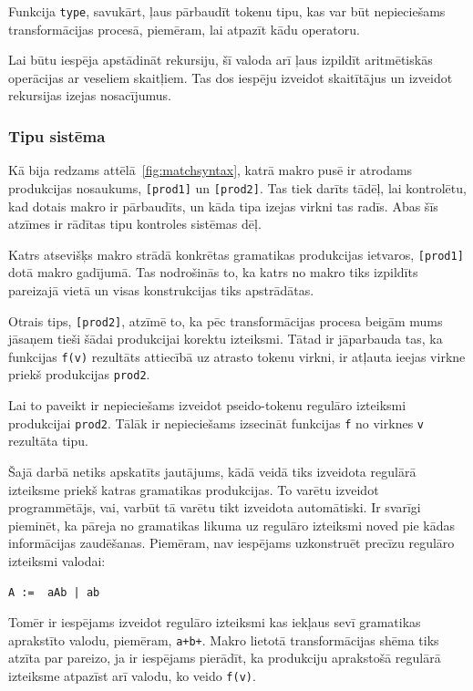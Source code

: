 Funkcija \verb|type|, savukārt, ļaus pārbaudīt tokenu tipu, kas var būt nepieciešams transformācijas procesā, piemēram, lai atpazīt kādu operatoru.

Lai būtu iespēja apstādināt rekursiju, šī valoda arī ļaus izpildīt aritmētiskās operācijas ar veseliem skaitļiem. Tas dos iespēju izveidot skaitītājus un izveidot rekursijas izejas nosacījumus.

\subsubsection{\label{sbsbs:sys_typesystem}Tipu sistēma}

Kā bija redzams attēlā~\ref{fig:matchsyntax}, katrā makro pusē ir atrodams produkcijas nosaukums, \verb|[prod1]| un \verb|[prod2]|. Tas tiek darīts tādēļ, lai kontrolētu, kad dotais makro ir pārbaudīts, un kāda tipa izejas virkni tas radīs. Abas šīs atzīmes ir rādītas tipu kontroles sistēmas dēļ.

Katrs atsevišķs makro strādā konkrētas gramatikas produkcijas ietvaros, \verb|[prod1]| dotā makro gadījumā. Tas nodrošinās to, ka katrs no makro tiks izpildīts pareizajā vietā un visas konstrukcijas tiks apstrādātas. 

Otrais tips, \verb|[prod2]|, atzīmē to, ka pēc transformācijas procesa beigām mums jāsaņem tieši šādai produkcijai korektu izteiksmi. Tātad ir jāparbauda tas, ka funkcijas \verb|f(v)| rezultāts attiecībā uz atrasto tokenu virkni, ir atļauta ieejas virkne priekš produkcijas \verb|prod2|.

Lai to paveikt ir nepieciešams izveidot pseido-tokenu regulāro izteiksmi produkcijai \verb|prod2|. Tālāk ir nepieciešams izsecināt funkcijas \verb|f| no virknes \verb|v| rezultāta tipu.

Šajā darbā netiks apskatīts jautājums, kādā veidā tiks izveidota regulārā izteiksme priekš katras gramatikas produkcijas. To varētu izveidot programmētājs, vai, varbūt tā varētu tikt izveidota automātiski. Ir svarīgi pieminēt, ka pāreja no gramatikas likuma uz regulāro izteiksmi noved pie kādas informācijas zaudēšanas. Piemēram, nav iespējams uzkonstruēt precīzu regulāro izteiksmi valodai:

\begin{verbatim}
A :=  aAb | ab
\end{verbatim}

Tomēr ir iespējams izveidot regulāro izteiksmi kas iekļaus sevī gramatikas aprakstīto valodu, piemēram, \verb|a+b+|. Makro lietotā transformācijas shēma tiks atzīta par pareizo, ja ir iespējams pierādīt, ka produkciju aprakstošā regulārā izteiksme atpazīst arī valodu, ko veido \verb|f(v)|.

